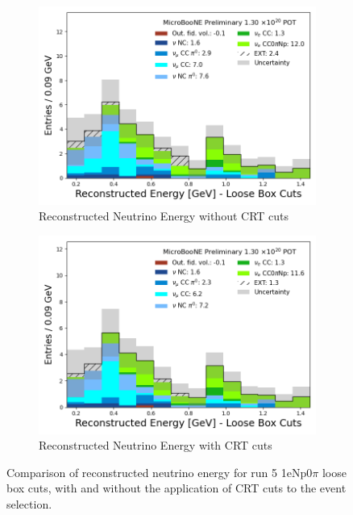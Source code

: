\begin{figure}[H] \centering
    \begin{subfigure}[t]{0.45\linewidth}
        \includegraphics[width=\linewidth]{technote/EventSelections/FiguresCRT/run5_Np_loose.png}
        \caption{Reconstructed Neutrino Energy without CRT cuts}
    \end{subfigure}%
    \hspace{0.45cm}%
    \begin{subfigure}[t]{0.45\linewidth}
        \includegraphics[width=\linewidth]{technote/EventSelections/FiguresCRT/run5_Np_loose_crt.png}%
        \caption{Reconstructed Neutrino Energy with CRT cuts}
    \end{subfigure}%
    \caption{Comparison of reconstructed neutrino energy for run 5 1eNp0$\pi$ loose box cuts, with and without the application of CRT cuts to the event selection.}
    \label{fig:1eNp_loosecuts}
\end{figure}

